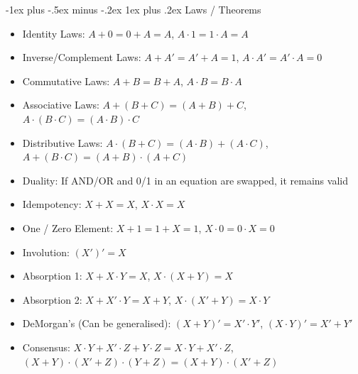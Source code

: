 \documentclass[10pt, portrait]{article}
\makeatletter
\renewcommand{\subsection}{\@startsection{subsection}{3}{0mm}%
                                {-1ex plus -.5ex minus -.2ex}%
                                {1ex plus .2ex}%
                                {\normalfont\small\bfseries}}%
\makeatother
\begin{document}
\begin{multicols*}{2}
\subsection{Laws / Theorems}
\begin{itemize}
    \item Identity Laws: $A+0=0+A=A$, $A\cdot 1 = 1 \cdot A=A$
    \item Inverse/Complement Laws: $A+A'=A'+A=1$, $A\cdot A' = A'\cdot A = 0$
    \item Commutative Laws: $A+B=B+A$, $A\cdot B= B\cdot A$
    \item Associative Laws: $A+(B+C)=(A+B)+C$, $A\cdot(B\cdot C)=(A\cdot B)\cdot C$
    \item Distributive Laws: $A\cdot(B+C)=(A\cdot B)+(A\cdot C)$, $A+(B\cdot C)=(A+B)\cdot(A+C)$
    \item Duality: If AND/OR and 0/1 in an equation are swapped, it remains valid
    \item Idempotency: $X+X=X$, $X\cdot X = X$
    \item One / Zero Element: $X+1=1+X=1$, $X\cdot 0 = 0 \cdot X = 0$
    \item Involution: $(X')'=X$
    \item Absorption 1: $X+X\cdot Y=X$, $X\cdot(X+Y)=X$
    \item Absorption 2: $X+X'\cdot Y=X+Y$, $X\cdot(X'+Y)=X\cdot Y$
    \item DeMorgan's (Can be generalised): $(X+Y)'=X'\cdot Y'$, $(X\cdot Y)'=X'+Y'$
    \item Consensus: $X\cdot Y+X'\cdot Z+Y\cdot Z=X\cdot Y + X' \cdot Z$, $(X+Y)\cdot(X'+Z)\cdot(Y+Z)=(X+Y)\cdot(X'+Z)$
\end{itemize}


\end{multicols*}
\end{document}
